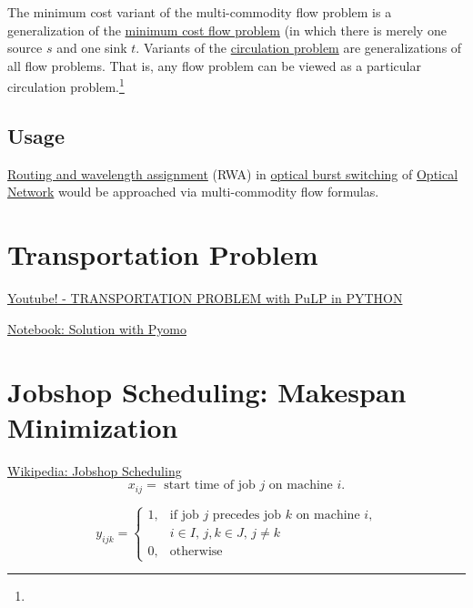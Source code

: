 The minimum cost variant of the multi-commodity flow problem is a
generalization of the \href{minimum_cost_flow_problem}{minimum cost flow
problem} (in which there is merely one source \(s\) and one sink \(t\).
Variants of the \href{circulation_problem}{circulation problem} are
generalizations of all flow problems. That is, any flow problem can be
viewed as a particular circulation problem.\footnote{}

\hypertarget{usage}{%
\subsection{Usage}\label{usage}}

\href{Routing_and_wavelength_assignment}{Routing and wavelength
assignment} (RWA) in \href{optical_burst_switching}{optical burst
switching} of \href{SONET}{Optical Network} would be approached via
multi-commodity flow formulas.


\section{Transportation Problem}

\href{https://www.youtube.com/watch?v=Jr7LI-sUEmo}{Youtube! - TRANSPORTATION PROBLEM with PuLP in PYTHON}

\href{https://nbviewer.jupyter.org/github/Pyomo/PyomoGallery/blob/master/transport/transport.ipynb}{Notebook: Solution with Pyomo}

\section{Jobshop Scheduling: Makespan Minimization}

\href{https://en.wikipedia.org/wiki/Job_shop_scheduling}{Wikipedia: Jobshop Scheduling}
$$
x_{ij} = \text{ start time of job $j$ on machine $i$}.
$$

$$
y_{ijk} = \begin{cases} 1, & \text{if job } j \text{ precedes job } k \text{ on machine } i \text{,}\\ & i \in I \text{, } j, k  \in J \text{, } j \neq k \\ 0, & \text{otherwise} \end{cases}
$$



